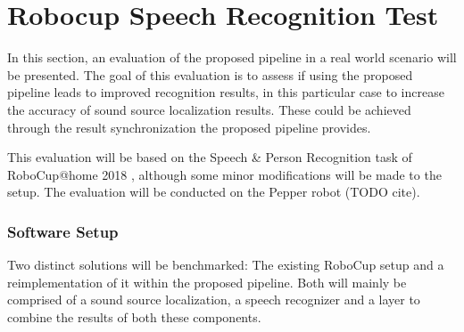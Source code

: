 
\section{Robocup Speech Recognition Test}
\label{eval:task_start}
In this section, an evaluation of the proposed pipeline in a real world scenario will be presented.
The goal of this evaluation is to assess if using the proposed pipeline leads to improved recognition results, in this particular case to increase the accuracy of sound source localization results.
These could be achieved through the result synchronization the proposed pipeline provides.

This evaluation will be based on the Speech \& Person Recognition task of RoboCup@home 2018 \cite{rulebook_2018}, although some minor modifications will be made to the setup.
The evaluation will be conducted on the Pepper robot (TODO cite).

\subsubsection{Software Setup}
Two distinct solutions will be benchmarked:
The existing RoboCup setup and a reimplementation of it within the proposed pipeline.
Both will mainly be comprised of a sound source localization, a speech recognizer and a layer to combine the results of both these components.

